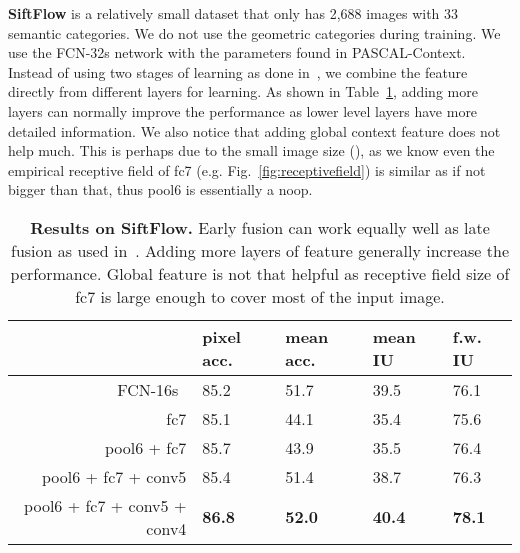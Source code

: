 \documentclass{article} \usepackage{iclr2016_conference}
\begin{document}
\noindent\textbf{SiftFlow} is a relatively small dataset that only has 2,688 images with 33 semantic categories. We do not use the geometric categories during training. We use the FCN-32s network with the parameters found in PASCAL-Context. Instead of using two stages of learning as done in~\cite{long2014fully}, we combine the feature directly from different layers for learning. As shown in Table~\ref{tab:siftflow}, adding more layers can normally improve the performance as lower level layers have more detailed information. We also notice that adding global context feature does not help much. This is perhaps due to the small image size (), as we know even the empirical receptive field of fc7 (e.g. Fig.~\ref{fig:receptivefield}) is similar as if not bigger than that, thus pool6 is essentially a noop.
\begin{table}[!htb]
	\centering
	\begin{tabular}{r|p{1.5em}p{1.5em}p{1.5em}p{1.5em}}
		& pixel acc. & mean acc. & mean IU & f.w. IU\\
		\hline\hline
		FCN-16s~\cite{long2014fully} & 85.2 & 51.7 & 39.5 & 76.1\\
		\hline
		fc7 & 85.1 & 44.1 & 35.4 & 75.6\\
		pool6 + fc7 & 85.7 & 43.9 & 35.5 & 76.4\\
		pool6 + fc7 + conv5 & 85.4 & 51.4 & 38.7 & 76.3\\
		pool6 + fc7 + conv5 + conv4 & \textbf{86.8} & \textbf{52.0} & \textbf{40.4} & \textbf{78.1}\\
		\hline
	\end{tabular}
	\caption{\textbf{Results on SiftFlow.} Early fusion can work equally well as late fusion as used in~\cite{long2014fully}. Adding more layers of feature generally increase the performance. Global feature is not that helpful as receptive field size of fc7 is large enough to cover most of the input image.}\label{tab:siftflow}
\end{table}
\vspace{-0.5em}
\end{document}
